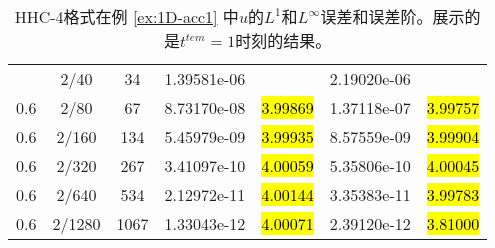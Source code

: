 \begin{table}[htbp]
	\caption{HHC-4格式在例 \ref{ex:1D-acc1} 中$u$的$L^1$和$L^\infty$误差和误差阶。展示的是$t^{tem} = 1$时刻的结果。}
	\label{ta:1D-ex1-HHC4}
	\centering
	\begin{tabular}{ccccccc}
		\toprule
		\titleintable
		\midrule
		0.6 & 2/40   & 34   & 1.39581e-06 &              & 2.19020e-06 &              \\
		0.6 & 2/80   & 67   & 8.73170e-08 & \hl{3.99869} & 1.37118e-07 & \hl{3.99757} \\
		0.6 & 2/160  & 134  & 5.45979e-09 & \hl{3.99935} & 8.57559e-09 & \hl{3.99904} \\
		0.6 & 2/320  & 267  & 3.41097e-10 & \hl{4.00059} & 5.35806e-10 & \hl{4.00045} \\
		0.6 & 2/640  & 534  & 2.12972e-11 & \hl{4.00144} & 3.35383e-11 & \hl{3.99783} \\
		0.6 & 2/1280 & 1067 & 1.33043e-12 & \hl{4.00071} & 2.39120e-12 & \hl{3.81000} \\
		\bottomrule
	\end{tabular}
\end{table}
\undef\titleintable